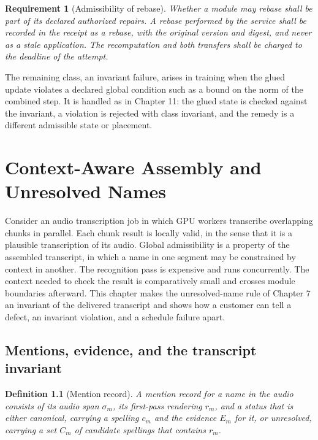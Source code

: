 \documentclass[11pt,openany]{book}
\newtheorem{definition}{Definition}[chapter]
\newtheorem{requirement}{Requirement}[chapter]
\theoremstyle{remark}
\begin{document}
\begin{requirement}[Admissibility of rebase]
Whether a module may rebase shall be part of its declared authorized repairs. A rebase performed by the service shall be recorded in the receipt as a rebase, with the original version and digest, and never as a stale application. The recomputation and both transfers shall be charged to the deadline of the attempt.
\end{requirement}

The remaining class, an invariant failure, arises in training when the glued update violates a declared global condition such as a bound on the norm of the combined step. It is handled as in Chapter 11: the glued state is checked against the invariant, a violation is rejected with class invariant, and the remedy is a different admissible state or placement.

\chapter{Context-Aware Assembly and Unresolved Names}

Consider an audio transcription job in which GPU workers transcribe overlapping chunks in parallel. Each chunk result is locally valid, in the sense that it is a plausible transcription of its audio. Global admissibility is a property of the assembled transcript, in which a name in one segment may be constrained by context in another. The recognition pass is expensive and runs concurrently. The context needed to check the result is comparatively small and crosses module boundaries afterward. This chapter makes the unresolved-name rule of Chapter 7 an invariant of the delivered transcript and shows how a customer can tell a defect, an invariant violation, and a schedule failure apart.

\section{Mentions, evidence, and the transcript invariant}

\begin{definition}[Mention record]
A mention record for a name in the audio consists of its audio span $\sigma_m$, its first-pass rendering $r_m$, and a status that is either canonical, carrying a spelling $c_m$ and the evidence $E_m$ for it, or unresolved, carrying a set $C_m$ of candidate spellings that contains $r_m$.
\end{definition}
\end{document}
